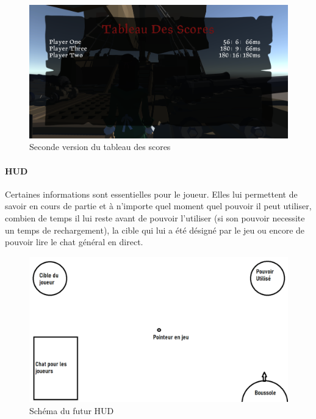         \begin{figure}[hbt!]
        \centering
            \includegraphics[scale=0.29]{img/newscoreboard.PNG}
            \caption{Seconde version du tableau des scores}
        \end{figure}


        \paragraph{HUD}
        Certaines informations sont essentielles pour le joueur. Elles lui permettent de savoir en cours de partie et à n'importe quel moment quel pouvoir il peut utiliser, combien de temps il lui reste avant de pouvoir l'utiliser (si son pouvoir necessite un temps de rechargement), la cible qui lui a été désigné par le jeu ou encore de pouvoir lire le chat général en direct.
        
        \begin{figure}[hbt!]
                \centering
                \includegraphics[scale=0.3]{img/schem_hud.png}
                \caption{Schéma du futur HUD}
        \end{figure}
        

